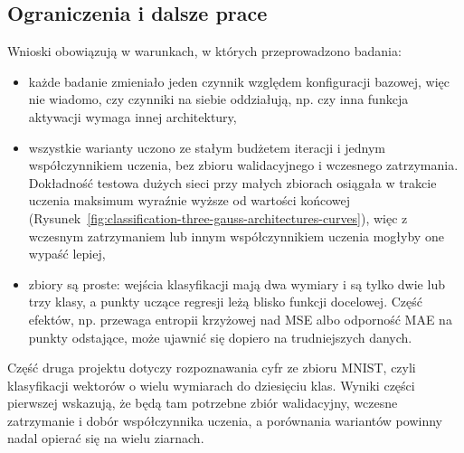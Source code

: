 \subsection{Ograniczenia i dalsze prace}
\label{sec:conclusions-limitations}

Wnioski obowiązują w warunkach, w których przeprowadzono badania:
\begin{itemize}
    \item każde badanie zmieniało jeden czynnik względem konfiguracji bazowej, więc nie wiadomo, czy czynniki na siebie oddziałują, np. czy inna funkcja aktywacji wymaga innej architektury,
    \item wszystkie warianty uczono ze stałym budżetem iteracji i jednym współczynnikiem uczenia, bez zbioru walidacyjnego i wczesnego zatrzymania. Dokładność testowa dużych sieci przy małych zbiorach osiągała w trakcie uczenia maksimum wyraźnie wyższe od wartości końcowej (Rysunek~\ref{fig:classification-three-gauss-architectures-curves}), więc z wczesnym zatrzymaniem lub innym współczynnikiem uczenia mogłyby one wypaść lepiej,
    \item zbiory są proste: wejścia klasyfikacji mają dwa wymiary i są tylko dwie lub trzy klasy, a punkty uczące regresji leżą blisko funkcji docelowej. Część efektów, np. przewaga entropii krzyżowej nad MSE albo odporność MAE na punkty odstające, może ujawnić się dopiero na trudniejszych danych.
\end{itemize}
Część druga projektu dotyczy rozpoznawania cyfr ze zbioru MNIST, czyli klasyfikacji wektorów o wielu wymiarach do dziesięciu klas. Wyniki części pierwszej wskazują, że będą tam potrzebne zbiór walidacyjny, wczesne zatrzymanie i dobór współczynnika uczenia, a porównania wariantów powinny nadal opierać się na wielu ziarnach.
